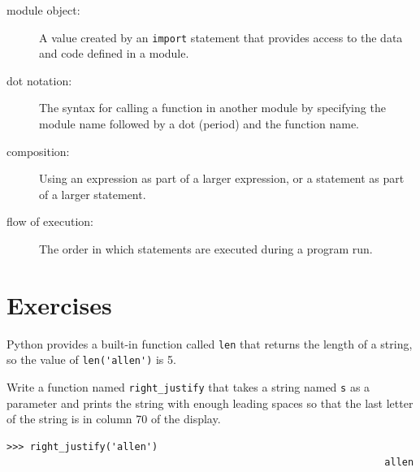 \documentclass[10pt]{book}
\begin{document}
\begin{description}
\item[module object:] A value created by an {\tt import} statement
that provides access to the data and code defined in a module.

\item[dot notation:]  The syntax for calling a function in another
module by specifying the module name followed by a dot (period) and
the function name.

\item[composition:] Using an expression as part of a larger expression,
or a statement as part of a larger statement.

\item[flow of execution:]  The order in which statements are executed during
a program run.


\end{description}


\section{Exercises}

\begin{ex}


Python provides a built-in function called {\tt len} that
returns the length of a string, so the value of \verb"len('allen')" is 5.

Write a function named \verb"right_justify" that takes a string
named {\tt s} as a parameter and prints the string with enough
leading spaces so that the last letter of the string is in column 70
of the display.

\beforeverb
\begin{verbatim}
>>> right_justify('allen')
                                                                 allen
\end{verbatim}
\afterverb

\end{ex}
\end{document}
